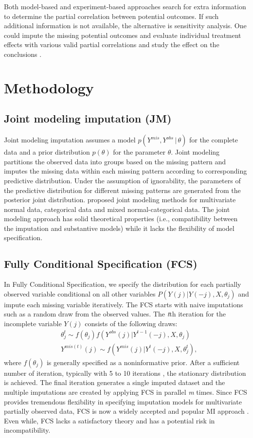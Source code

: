 	Both model-based and experiment-based approaches search for extra information to determine the partial correlation between potential outcomes. If such additional information is not available, the alternative is sensitivity analysis. One could impute the missing potential outcomes and evaluate individual treatment effects with various valid partial correlations and study the effect on the conclusions \citep{gadbury2001evaluating}. 
	
	\section{Methodology}
	\label{sec:4.3}
	\subsection{Joint modeling imputation (JM)}
	Joint modeling imputation assumes a model $p(Y^{mis}, Y^{obs}\,|\,\theta)$ for the complete data and a prior distribution $p(\theta)$ for the parameter $\theta$. Joint modeling partitions the observed data into groups based on the missing pattern and imputes the missing data within each missing pattern according to corresponding predictive distribution. Under the assumption of ignorability, the parameters of the predictive distribution for different missing patterns are generated from the posterior joint distribution. \citet{schafer1997analysis} proposed joint modeling methods for multivariate normal data, categorical data and mixed normal-categorical data. The joint modeling approach has solid theoretical properties (i.e., compatibility between the imputation and substantive models) while it lacks the flexibility of model specification.
	
	\subsection{Fully Conditional Specification (FCS)}
	In Fully Conditional Specification, we specify the distribution for each partially observed variable conditional on all other variables $P(Y(j)|Y(-j), X, \theta_{j})$ and impute each missing variable iteratively. The FCS starts with naive imputations such as a random draw from the observed values. The \emph{t}th iteration for the incomplete variable \emph{$Y(j)$} consists of the following draws:
	\begin{align*}
		&\theta_{j}^{t} \sim f(\theta_{j})f(Y^{obs}(j)|Y^{t-1}(-j), X, \theta_{j})\\
		&Y^{mis(t)}(j) \sim f(Y^{mis}(j)|Y^{t}(-j), X, \theta_{j}^{t}),
	\end{align*}
	where $f(\theta_{j})$ is generally specified as a noninformative prior. After a sufficient number of iteration, typically with 5 to 10 iterations \citep{Buuren2018, oberman2020missing}, the stationary distribution is achieved. The final iteration generates a single imputed dataset and the multiple imputations are created by applying FCS in parallel \emph{m} times. Since FCS provides tremendous flexibility in specifying imputation models for multivariate partially observed data, FCS is now a widely accepted and popular MI approach \citep{van2007multiple}. Even while, FCS lacks a satisfactory theory and has a potential risk in incompatibility. 
	
